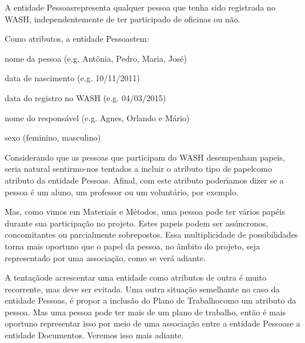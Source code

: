 \documentclass[
12pt,		%
openright,	%
twoside,  %
a4paper,			%
chapter=TITLE,		%
english,			%
french,				%
spanish,			%
brazil				%
]{USPSC-classe/USPSC}
\begin{document}
A entidade \textquotedbl Pessoas\textquotedbl  representa qualquer pessoa que tenha sido registrada no WASH, independentemente de ter participado de oficinas ou n\~ao.









Como atributos, a entidade \textquotedbl Pessoas\textquotedbl  tem:










\begin{alineas}
\item nome da pessoa (e.g. Ant\^onia, Pedro, Maria, Jos\'e)
\item data de nascimento (e.g. 10/11/2011)
\item data do registro no WASH (e.g. 04/03/2015)
\item nome do respons\'avel (e.g. Agnes, Orlando e M\'ario)
\item sexo (feminino, masculino)
\end{alineas}

Considerando que as pessoas que participam do WASH desempenham \textquotedbl papeis\textquotedbl , seria natural sentirmo-nos tentados a incluir o atributo \textquotedbl tipo de papel\textquotedbl  como atributo da entidade \textquotedbl Pessoas\textquotedbl . Afinal, com este atributo poder\'{\i}amos dizer se a pessoa \'e um aluno, um professor ou um volunt\'ario, por exemplo.









Mas, como vimos em Materiais e M\'etodos, uma pessoa pode ter v\'arios pap\'eis durante sua participa\c{c}\~ao no projeto. Estes papeis podem ser ass\'{\i}ncronos, concomitantes ou parcialmente sobrepostos. Essa multiplicidade de possibilidades torna mais oportuno que  o papel da pessoa, no \^ambito do projeto, seja representado por uma associa\c{c}\~ao, como se ver\'a adiante.









A \textquotedbl tenta\c{c}\~ao\textquotedbl  de acrescentar uma entidade como atributos de outra \'e muito recorrente, mas deve ser evitada. Uma outra situa\c{c}\~ao semelhante no caso da entidade \textquotedbl Pessoas\textquotedbl , \'e propor a inclus\~ao do \textquotedbl Plano de Trabalho\textquotedbl  como um atributo da pessoa. Mas uma pessoa pode ter mais de um plano de trabalho, ent\~ao \'e mais oportuno representar isso por meio de uma associa\c{c}\~ao entre a entidade \textquotedbl Pessoas\textquotedbl  e a entidade \textquotedbl Documentos\textquotedbl . Veremos isso mais adiante.
\end{document}
